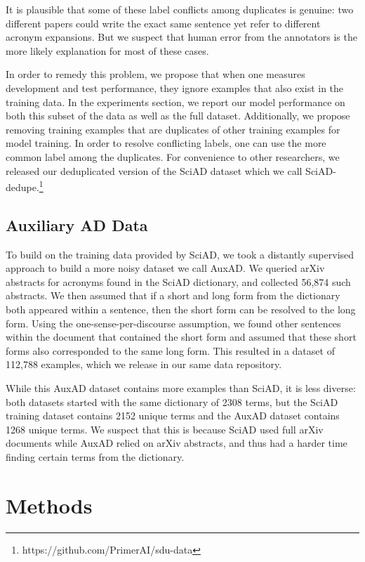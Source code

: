 \documentclass[letterpaper]{article} %
\begin{document}
It is plausible that some of these label conflicts among duplicates is genuine: two different papers could write the exact same sentence yet refer to different acronym expansions. But we suspect that human error from the annotators is the more likely explanation for most of these cases.

In order to remedy this problem, we propose that when one measures development and test performance, they ignore examples that also exist in the training data. In the experiments section, we report our model performance on both this subset of the data as well as the full dataset. Additionally, we propose removing training examples that are duplicates of other training examples for model training. In order to resolve conflicting labels, one can use the more common label among the duplicates. For convenience to other researchers, we released our deduplicated version of the SciAD dataset which we call SciAD-dedupe.\footnote{https://github.com/PrimerAI/sdu-data}

\subsection{Auxiliary AD Data}
To build on the training data provided by SciAD, we took a distantly supervised approach to build a more noisy dataset we call AuxAD. We queried arXiv abstracts for acronyms found in the SciAD dictionary, and collected 56,874 such abstracts. We then assumed that if a short and long form from the dictionary both appeared within a sentence, then the short form can be resolved to the long form. Using the one-sense-per-discourse assumption, we found other sentences within the document that contained the short form and assumed that these short forms also corresponded to the same long form. This resulted in a dataset of 112,788 examples, which we release in our same data repository.

While this AuxAD dataset contains more examples than SciAD, it is less diverse: both datasets started with the same dictionary of 2308 terms, but the SciAD training dataset contains 2152 unique terms and the AuxAD dataset contains 1268 unique terms. We suspect that this is because SciAD used full arXiv documents while AuxAD relied on arXiv abstracts, and thus had a harder time finding certain terms from the dictionary.

\section{Methods}
\end{document}
